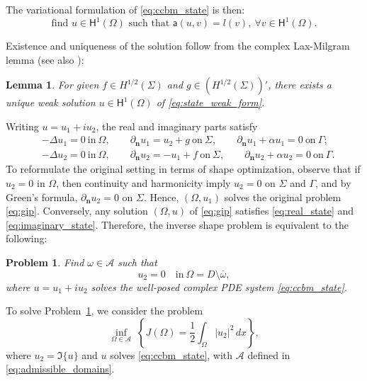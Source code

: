 \documentclass[a4paper,11pt]{article}
\newtheorem{lemma}[theorem]{Lemma}
\newtheorem{problem}{Problem}
\newcommand{\vect}[1]{\boldsymbol{\mathbf{#1}}}
\newcommand{\ur}{u_{1}}
\newcommand{\ui}{u_{2}}
\newcommand{\aaa}{{\mathsf{a}}}
\newcommand{\HH}{\vect{\mathsf{H}}}
\newcommand{\nn}{\vect{n}}
\newcommand{\intO}[1]{\int_{\varOmega}{#1}{\, {d}{x}}}
\begin{document}
The variational formulation of \eqref{eq:ccbm_state} is then:
\begin{equation}\label{eq:state_weak_form}
\text{find } u \in \HH^{1}(\varOmega) \text{ such that } \aaa(u,v) = l(v), \ \forall v \in \HH^{1}(\varOmega).
\end{equation}

Existence and uniqueness of the solution follow from the complex Lax-Milgram lemma \cite[p. 376]{DautrayLionsv21998} (see also \cite[Lem. 2.1.51, p. 40]{SauterSchwab2011}):  

\begin{lemma}
For given $f \in H^{1/2}(\varSigma)$ and $g \in (H^{1/2}(\varSigma))'$, there exists a unique weak solution $u \in \HH^{1}(\varOmega)$ of \eqref{eq:state_weak_form}.
\end{lemma} 
%
%
Writing $u = \ur + i \ui$, the real and imaginary parts satisfy
\begin{align}
&-\Delta \ur = 0 \ \text{in} \ \varOmega, \qquad
\partial_{\nn} \ur = \ui + g \ \text{on} \ \varSigma, \qquad
\partial_{\nn} \ur + \alpha \ur = 0 \ \text{on} \ \varGamma; \label{eq:real_state} \\
&-\Delta \ui = 0 \ \text{in} \ \varOmega, \qquad
\partial_{\nn} \ui = -\ur + f \ \text{on} \ \varSigma, \qquad
\partial_{\nn} \ui + \alpha \ui = 0 \ \text{on} \ \varGamma. \label{eq:imaginary_state}
\end{align}
To reformulate the original setting in terms of shape optimization, observe that if $\ui = 0$ in $\varOmega$, then continuity and harmonicity imply $\ui = 0$ on $\varSigma$ and $\varGamma$, and by Green's formula, $\partial_{\nn} \ui = 0$ on $\varSigma$.
Hence, $(\varOmega, \ur)$ solves the original problem \eqref{eq:gip}. Conversely, any solution $(\varOmega,u)$ of \eqref{eq:gip} satisfies \eqref{eq:real_state} and \eqref{eq:imaginary_state}. 
Therefore, the inverse shape problem is equivalent to the following:
\begin{problem}
\label{eq:main_problem}
Find $\omega \in \mathcal{A}$ such that 
\[
\ui = 0 \quad \text{in} \ \varOmega = D \setminus \overline{\omega},
\]
where $u = \ur + i \ui$ solves the well-posed complex PDE system \eqref{eq:ccbm_state}.
\end{problem}
%
%
%
To solve Problem~\ref{eq:main_problem}, we consider the problem
\begin{equation}\label{eq:shape_problem}
\inf_{\varOmega \in \mathcal{A}} \; \left\{
J(\varOmega)
= \frac12 \intO{|\ui|^2} \right\},
\end{equation}
where $\ui = \Im\{u\}$ and $u$ solves \eqref{eq:ccbm_state}, with $\mathcal{A}$ defined in \eqref{eq:admissible_domains}.
\end{document}
